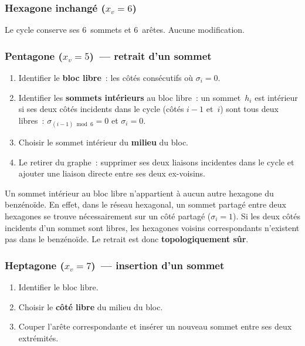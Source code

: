 \documentclass[12pt,a4paper]{article}
\theoremstyle{definition}
\theoremstyle{remark}
\begin{document}
\subsubsection{Hexagone inchang\'e ($x_v = 6$)}

Le cycle conserve ses 6~sommets et 6~ar\^etes. Aucune modification.

\subsubsection{Pentagone ($x_v = 5$)~--- retrait d'un sommet}

\begin{enumerate}[nosep]
  \item Identifier le \textbf{bloc libre}~: les c\^ot\'es cons\'ecutifs
        o\`u $\sigma_i = 0$.
  \item Identifier les \textbf{sommets int\'erieurs} au bloc libre~: un
        sommet~$h_i$ est int\'erieur si ses deux c\^ot\'es incidents dans
        le cycle (c\^ot\'es $i{-}1$ et~$i$) sont tous deux libres~:
        $\sigma_{(i-1) \bmod 6} = 0$ et $\sigma_i = 0$.
  \item Choisir le sommet int\'erieur du \textbf{milieu} du bloc.
  \item Le retirer du graphe~: supprimer ses deux liaisons incidentes dans
        le cycle et ajouter une liaison directe entre ses deux ex-voisins.
\end{enumerate}

\begin{notebox}
Un sommet int\'erieur au bloc libre n'appartient \`a aucun autre hexagone
du benz\'eno\"ide. En effet, dans le r\'eseau hexagonal, un sommet partag\'e
entre deux hexagones se trouve n\'ecessairement sur un c\^ot\'e partag\'e
($\sigma_i = 1$). Si les deux c\^ot\'es incidents d'un sommet sont libres,
les hexagones voisins correspondants n'existent pas dans le benz\'eno\"ide.
Le retrait est donc \textbf{topologiquement s\^ur}.
\end{notebox}

\subsubsection{Heptagone ($x_v = 7$)~--- insertion d'un sommet}

\begin{enumerate}[nosep]
  \item Identifier le bloc libre.
  \item Choisir le \textbf{c\^ot\'e libre} du milieu du bloc.
  \item Couper l'ar\^ete correspondante et ins\'erer un nouveau sommet
        entre ses deux extr\'emit\'es.
\end{enumerate}
\end{document}
